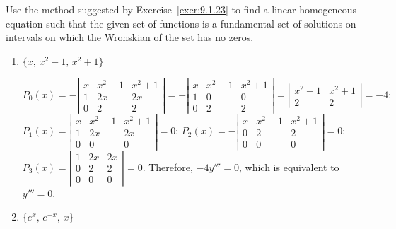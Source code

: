 \documentclass{ximera}
\begin{document}
\begin{problem}\label{exer:9.1.24}
Use the method suggested by Exercise~\ref{exer:9.1.23}  to find a linear
homogeneous equation such that the given set of functions
is a fundamental set of solutions on intervals on which the Wronskian
of the set has no zeros.

\begin{enumerate}
 \item  $\{x,\,x^2-1,\,x^2+1\}$

\begin{solution}
$$
P_0(x)=
-\left|\begin{array}{ccc}
x&x^2-1&x^2+1\\
1&2x&2x\\0&2&2
\end{array}\right|=
-\left|\begin{array}{ccc}
x&x^2-1&x^2+1\\
1&0&0\\0&2&2
\end{array}\right|=
\left|\begin{array}{cc}
x^2-1&x^2+1\\2&2
\end{array}\right|=-4;
$$
$P_1(x)=
\left|\begin{array}{ccc}x&x^2-1&x^2+1\\1&2x&2x\\0&0&0\end{array}\right|=0$;
$P_2(x)=-
\left|\begin{array}{ccc}x&x^2-1&x^2+1\\0&2&2\\0&0&0\end{array}\right|=0$;
$P_3(x)=
\left|\begin{array}{ccc}1&2x&2x\\0&2&2\\0&0&0\end{array}\right|=0$.
Therefore, $-4y'''=0$, which is equivalent
to $y'''=0$.
\end{solution}
 
 \item  $\{e^x,\,e^{-x},\,x\}$


\end{enumerate}
\end{problem}
\end{document}
